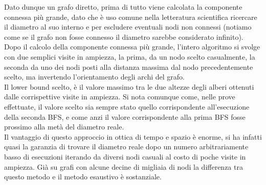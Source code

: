 \documentclass[twoside,openright,titlepage,fleqn,
	headinclude,11pt,a4paper,BCOR5mm,footinclude,pdftex
	]{scrbook}
\begin{document}
Dato dunque un grafo diretto, prima di tutto viene calcolata la componente connessa più grande, dato che è uso comune nella letteratura scientifica ricercare il diametro al suo interno e per escludere eventuali nodi non connessi (notiamo come se il grafo non fosse connesso il diametro sarebbe considerato infinito).\\Dopo il calcolo della componente connessa più grande, l'intero algoritmo si svolge con due semplici  visite in ampiezza, la prima, da un nodo scelto casualmente, la seconda da uno dei nodi posti alla distanza massima dal nodo precedentemente scelto, ma invertendo l'orientamento degli archi del grafo.\\Il lower bound scelto, è il valore massimo tra le due altezze degli alberi ottenuti dalle corrispettive visite in ampiezza. Si nota comunque come, nelle prove effettuate, il valore scelto sia sempre stato quello corrispondente all'esecuzione della seconda BFS, e come anzi il valore corrispondente alla prima BFS fosse prossimo alla metà del diametro reale.\\
Il vantaggio di questo approccio in ottica di tempo e spazio è enorme, si ha infatti quasi la garanzia di trovare il diametro reale dopo un numero arbitrariamente basso di esecuzioni iterando da diversi nodi casuali al costo di poche visite in ampiezza. Già su grafi con alcune decine di migliaia di nodi la differenza tra questo metodo e il metodo esaustivo è sostanziale.\\
\end{document}

